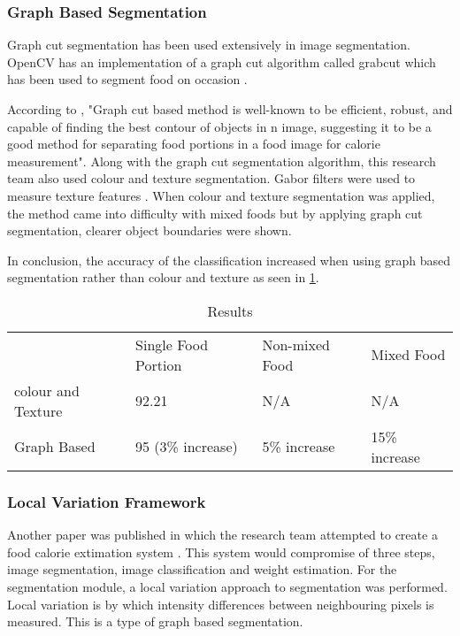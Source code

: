 \tocless\subsubsection{Graph Based Segmentation}
Graph cut segmentation has been used extensively  in image segmentation. OpenCV
has an implementation of a graph cut algorithm called grabcut which has been
used to segment food on occasion \parencite{graphCut}. 

According to \parencite{graphCut}, "Graph cut based method is well-known to be
efficient, robust, and capable of finding the best contour of objects in n
image, suggesting it to be a good method for separating food portions in a food
image for calorie measurement". Along with the graph cut segmentation algorithm,
this research team also used colour and texture segmentation. Gabor filters were
used to measure texture features \parencite{graphCut}. When colour and texture
segmentation was applied, the method came into difficulty with mixed foods but
by applying graph cut segmentation, clearer object boundaries were shown.

In conclusion, the accuracy of the classification increased when using graph
based segmentation rather than colour and texture as seen in \ref{graphCT}.

\begin{table}[]
	\centering
	\caption{Results}
	\label{graphCT}
	\begin{tabular}{llll}
		                  & Single Food Portion & Non-mixed Food & Mixed Food
						  \\
						  colour and Texture & 92.21               & N/A
						  & N/A           \\
						  Graph Based       & 95 (3\% increase)   & 5\% increase
						  & 15\% increase
	\end{tabular}
\end{table}

\tocless\subsubsection{Local Variation Framework}
Another paper was published in which the research team attempted to create a
food calorie extimation system \parencite{foodImageAnalysis}. This system would
compromise of three steps, image segmentation, image classification and weight
estimation. For the segmentation module, a local variation approach to
segmentation was performed. Local variation is by which intensity differences
between neighbouring pixels is measured. This is a type of graph based
segmentation.


